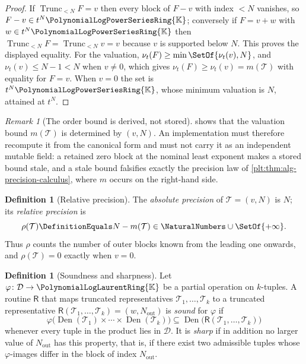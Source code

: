 \documentclass[11pt,oneside]{article}
\theoremstyle{plain}
\theoremstyle{definition}
\newtheorem{definition}[theorem]{Definition}
\theoremstyle{remark}
\newtheorem{remark}[theorem]{Remark}
\newcommand{\K}{\mathbb{K}}
\newcommand{\PLpow}{\PolynomialLogPowerSeriesRing{\K}}   %
\newcommand{\PLlau}{\PolynomialLogLaurentRing{\K}}       %
\newcommand{\ordt}{\nu_{t}}                              %
\newcommand{\Trunc}[2]{\operatorname{Trunc}_{<#2}#1}     %
\begin{document}
\begin{proof}
If \(\Trunc{F}{N}=v\) then every block of \(F-v\) with index \(<N\) vanishes,
so \(F-v\in t^N\PLpow\); conversely if \(F=v+w\) with \(w\in t^N\PLpow\) then
\(\Trunc{F}{N}=\Trunc{v}{N}=v\) because \(v\) is supported below \(N\).  This
proves the displayed equality.  For the valuation, \(\ordt(F)\ge
\min\SetOf{\ordt(v),N}\), and \(\ordt(v)\le N-1<N\) when \(v\ne0\), which gives
\(\ordt(F)\ge\ordt(v)=m(\mathcal T)\) with equality for \(F=v\).  When \(v=0\)
the set is \(t^N\PLpow\), whose minimum valuation is \(N\), attained at
\(t^N\).
\end{proof}

\begin{remark}[The order bound is derived, not stored]
\label{plt:rmk:alg-derived-order}
 shows that the valuation bound
\(m(\mathcal T)\) is determined by \((v,N)\).  An implementation must therefore
recompute it from the canonical form and must not carry it as an independent
mutable field: a retained zero block at the nominal least exponent makes a
stored bound stale, and a stale bound falsifies exactly the precision law of
\cref{plt:thm:alg-precision-calculus}, where \(m\) occurs on the right-hand
side.
\end{remark}

\begin{definition}[Relative precision]\label{plt:def:alg-relative-precision}
The \emph{absolute precision} of \(\mathcal T=(v,N)\) is \(N\); its
\emph{relative precision} is
\[
 \rho(\mathcal T)\DefinitionEquals N-m(\mathcal T)\in\NaturalNumbers\cup\SetOf{+\infty}.
\]
Thus \(\rho\) counts the number of outer blocks known from the leading one
onwards, and \(\rho(\mathcal T)=0\) exactly when \(v=0\).
\end{definition}

\begin{definition}[Soundness and sharpness]\label{plt:def:alg-sound}
Let \(\varphi\colon\mathcal D\to\PLlau\) be a partial operation on
\(k\)-tuples.  A routine \(\mathsf R\) that maps truncated representatives
\(\mathcal T_1,\dots,\mathcal T_k\) to a truncated representative
\(\mathsf R(\mathcal T_1,\dots,\mathcal T_k)=(w,N_{\mathrm{out}})\) is
\emph{sound} for \(\varphi\) if
\[
 \varphi\bigl(\operatorname{Den}(\mathcal T_1)\times\cdots\times\operatorname{Den}(\mathcal T_k)\bigr)
 \subseteq
 \operatorname{Den}\bigl(\mathsf R(\mathcal T_1,\dots,\mathcal T_k)\bigr)
\]
whenever every tuple in the product lies in \(\mathcal D\).  It is
\emph{sharp} if in addition no larger value of \(N_{\mathrm{out}}\) has this
property, that is, if there exist two admissible tuples whose \(\varphi\)-images
differ in the block of index \(N_{\mathrm{out}}\).
\end{definition}
\end{document}
